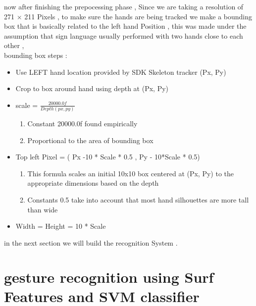 now after finishing  the prepocessing phase , Since we are taking a resolution of 271 $\times$ 211 Pixels , to make sure the hands are being tracked we make a bounding box that is basically related to the left hand Position , this was made under the assumption that sign language  usually performed with two hands close to each other , \\
bounding box steps : \\

\begin{itemize}
\item  Use LEFT hand location provided by SDK Skeleton  tracker (Px, Py)
 \item Crop to box around hand using depth at (Px, Py)
    \item scale = $\frac{20000.0f}{Depth(px,py)}$ 
    \begin{enumerate}
    \item Constant 20000.0f  found empirically
    \item Proportional to the area of bounding box 
    \end{enumerate}
\item Top left Pixel  = ( Px -10 * Scale * 0.5  , Py - 10*Scale * 0.5)
\begin{enumerate}
    \item This formula scales an initial 10x10 box centered at (Px, Py) to
the appropriate dimensions based on the depth 
    \item Constants 0.5  take into account that most hand
silhouettes are more tall than wide 
    \end{enumerate}
   \item Width = Height = 10 * Scale 
\end{itemize}

in the next section we will build the recognition System  .

\section{ gesture recognition using Surf  Features  and SVM  classifier }

